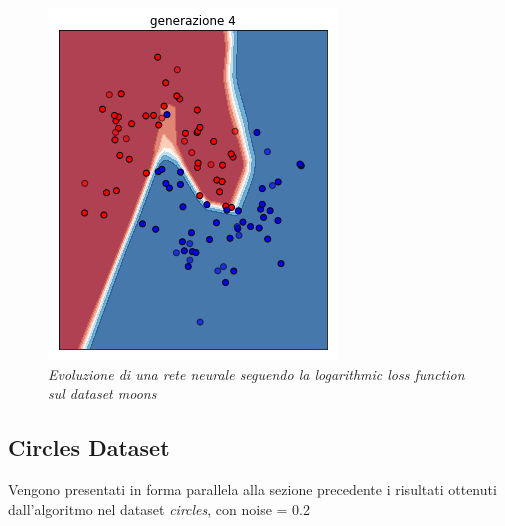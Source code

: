\documentclass[12pt,a4paper]{report}
\begin{document}
\begin{figure}[H]
 \includegraphics[scale = 0.37]{images/moons-rnd-log./4}
 \caption{\textit{Evoluzione di una rete neurale seguendo la logarithmic loss function sul dataset moons}}
 \label{moons3}
\end{figure}

\subsection{Circles Dataset}

Vengono presentati in forma parallela alla sezione precedente i risultati ottenuti dall'algoritmo nel dataset \textit{circles}, con noise = 0.2
\end{document}
